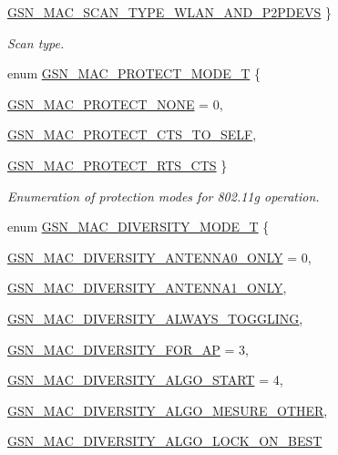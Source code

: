 \begin{DoxyCompactItemize}
\par
\hyperlink{a00642_ggacd7033290927ecd0c0b3b6e9829ecb2eaff33c56427944572c294ced551b38993}{GSN\_\-MAC\_\-SCAN\_\-TYPE\_\-WLAN\_\-AND\_\-P2PDEVS}
 \}
\begin{DoxyCompactList}\small\item\em Scan type. \end{DoxyCompactList}\item 
enum \hyperlink{a00642_gaa470d1007e57e516d1df5e4b8063182f}{GSN\_\-MAC\_\-PROTECT\_\-MODE\_\-T} \{ \par
\hyperlink{a00642_ggaa470d1007e57e516d1df5e4b8063182faebc94a474d588d14f27566401b67ec30}{GSN\_\-MAC\_\-PROTECT\_\-NONE} =  0, 
\par
\hyperlink{a00642_ggaa470d1007e57e516d1df5e4b8063182fac1649209fc916370cf2eb11fdedcaa6f}{GSN\_\-MAC\_\-PROTECT\_\-CTS\_\-TO\_\-SELF}, 
\par
\hyperlink{a00642_ggaa470d1007e57e516d1df5e4b8063182fa1909b4b4f8de41538af85b18c822c8dc}{GSN\_\-MAC\_\-PROTECT\_\-RTS\_\-CTS}
 \}
\begin{DoxyCompactList}\small\item\em Enumeration of protection modes for 802.11g operation. \end{DoxyCompactList}\item 
enum \hyperlink{a00642_gaabd0b61d3828dd59d93bb8be08f10ac6}{GSN\_\-MAC\_\-DIVERSITY\_\-MODE\_\-T} \{ \par
\hyperlink{a00642_ggaabd0b61d3828dd59d93bb8be08f10ac6af0b41fcfdb282436ce96f215518df7b7}{GSN\_\-MAC\_\-DIVERSITY\_\-ANTENNA0\_\-ONLY} =  0, 
\par
\hyperlink{a00642_ggaabd0b61d3828dd59d93bb8be08f10ac6a2108d8a409d1453f2dba556036e7949f}{GSN\_\-MAC\_\-DIVERSITY\_\-ANTENNA1\_\-ONLY}, 
\par
\hyperlink{a00642_ggaabd0b61d3828dd59d93bb8be08f10ac6abf76ce9526e8b9ca1c14fc5bed8215e4}{GSN\_\-MAC\_\-DIVERSITY\_\-ALWAYS\_\-TOGGLING}, 
\par
\hyperlink{a00642_ggaabd0b61d3828dd59d93bb8be08f10ac6a35eadd9c9bd58e7c7dd77f54f9cfa48d}{GSN\_\-MAC\_\-DIVERSITY\_\-FOR\_\-AP} =  3, 
\par
\hyperlink{a00642_ggaabd0b61d3828dd59d93bb8be08f10ac6a55627deea74bcc196d12110f41d7f6a9}{GSN\_\-MAC\_\-DIVERSITY\_\-ALGO\_\-START} =  4, 
\par
\hyperlink{a00642_ggaabd0b61d3828dd59d93bb8be08f10ac6a5eb675197b32e9b6eeab713023e910d9}{GSN\_\-MAC\_\-DIVERSITY\_\-ALGO\_\-MESURE\_\-OTHER}, 
\par
\hyperlink{a00642_ggaabd0b61d3828dd59d93bb8be08f10ac6a8faf40fc52be3915b495936e34a68c14}{GSN\_\-MAC\_\-DIVERSITY\_\-ALGO\_\-LOCK\_\-ON\_\-BEST}

\end{DoxyCompactItemize}
